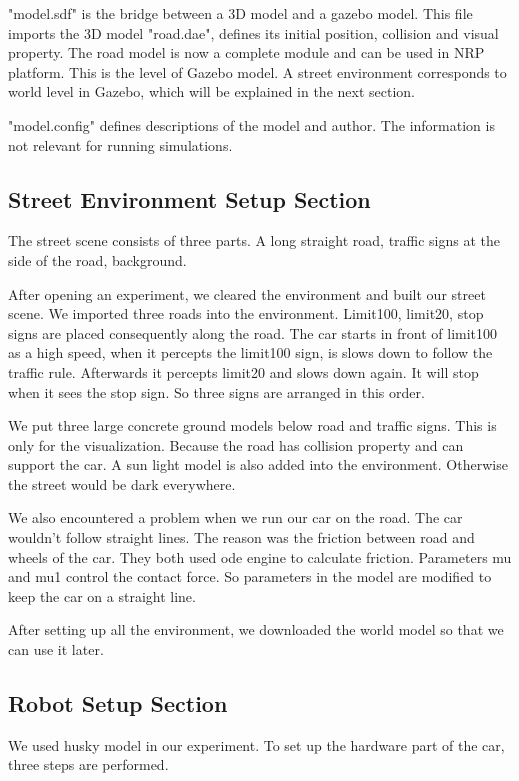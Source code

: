 "model.sdf" is the bridge between a 3D model and a gazebo model. This file imports the 3D model "road.dae", defines its initial position, collision and visual property. The road model is now a complete module and can be used in NRP platform. This is the level of Gazebo model. A street environment corresponds to world level in Gazebo, which will be explained in the next section.

"model.config" defines descriptions of the model and author. The information is not relevant for running simulations. 

\subsection{Street Environment Setup Section}
The street scene consists of three parts. A long straight road, traffic signs at the side of the road, background.

After opening an experiment, we cleared the environment and built our street scene. We imported three roads into the environment. Limit100, limit20, stop signs are placed consequently along the road. The car starts in front of limit100 as a high speed, when it percepts the limit100 sign, is slows down to follow the traffic rule. Afterwards it percepts limit20 and slows down again. It will stop when it sees the stop sign. So three signs are arranged in this order.


We put three large concrete ground models below road and traffic signs. This is only for the visualization. Because the road has collision property and can support the car. A sun light model is also added into the environment. Otherwise the street would be dark everywhere.

We also encountered a problem when we run our car on the road. The car wouldn't follow straight lines. The reason was the friction between road and wheels of the car. They both used ode engine to calculate friction. Parameters mu and mu1 control the contact force. So parameters in the model are modified to keep the car on a straight line. 

After setting up all the environment, we downloaded the world model so that we can use it later.


\subsection{Robot Setup Section}

We used husky model in our experiment. To set up the hardware part of the car, three steps are performed.


